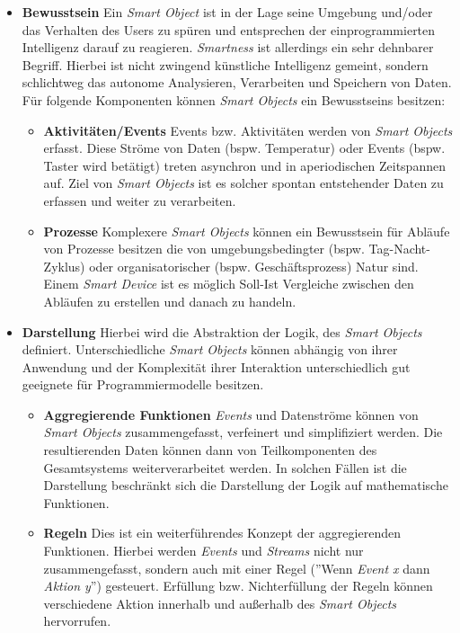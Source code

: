 \begin{itemize}
    \item \textbf{Bewusstsein} Ein \textit{Smart Object} ist in der Lage seine Umgebung und/oder das Verhalten des Users zu spüren und entsprechen der einprogrammierten Intelligenz darauf zu reagieren. \textit{Smartness} ist allerdings ein sehr dehnbarer Begriff. Hierbei ist nicht zwingend künstliche Intelligenz gemeint, sondern schlichtweg das autonome Analysieren, Verarbeiten und Speichern von Daten. Für folgende Komponenten können \textit{Smart Objects} ein Bewusstseins besitzen:
    \begin{itemize}
        \item \textbf{Aktivitäten/Events} Events bzw. Aktivitäten werden von \textit{Smart Objects} erfasst. Diese Ströme von Daten (bspw. Temperatur) oder Events (bspw. Taster wird betätigt) treten asynchron und in aperiodischen Zeitspannen auf. Ziel von \textit{Smart Objects} ist es solcher spontan entstehender Daten zu erfassen und weiter zu verarbeiten.
        \item \textbf{Prozesse} Komplexere \textit{Smart Objects} können ein Bewusstsein für Abläufe von Prozesse besitzen die von umgebungsbedingter (bspw. Tag-Nacht-Zyklus) oder organisatorischer (bspw. Geschäftsprozess) Natur sind. Einem \textit{Smart Device} ist es möglich Soll-Ist Vergleiche zwischen den Abläufen zu erstellen und danach zu handeln.
    \end{itemize}
    \item \textbf{Darstellung} Hierbei wird die Abstraktion der Logik, des \textit{Smart Objects} definiert. Unterschiedliche \textit{Smart Objects} können abhängig von ihrer Anwendung und der Komplexität ihrer Interaktion unterschiedlich gut geeignete für Programmiermodelle besitzen.
    \begin{itemize}
        \item \textbf{Aggregierende Funktionen} \textit{Events} und Datenströme können von \textit{Smart Objects} zusammengefasst, verfeinert und simplifiziert werden. Die resultierenden Daten können dann von Teilkomponenten des Gesamtsystems weiterverarbeitet werden. In solchen Fällen ist die Darstellung beschränkt sich die Darstellung der Logik auf mathematische Funktionen.
        \item \textbf{Regeln} Dies ist ein weiterführendes Konzept der aggregierenden Funktionen. Hierbei werden \textit{Events} und \textit{Streams} nicht nur zusammengefasst, sondern auch mit einer Regel (''Wenn \textit{Event x} dann \textit{Aktion y}'') gesteuert. Erfüllung bzw. Nichterfüllung der Regeln können verschiedene Aktion innerhalb und außerhalb des \textit{Smart Objects} hervorrufen.

\end{itemize}
\end{itemize}
